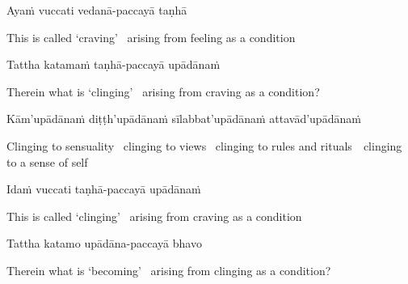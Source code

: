 Ayaṁ vuccati vedanā-paccayā taṇhā

\begin{english-hang}
  This is called `craving' \breathmark\ arising from feeling as a condition
\end{english-hang}

Tattha katamaṁ taṇhā-paccayā upādānaṁ

\begin{english-hang}
  Therein what is `clinging' \breathmark\ arising from craving as a condition?
\end{english-hang}

\begin{pali-hang}
  Kām'upādānaṁ diṭṭh'upādānaṁ sīlabbat'upādānaṁ attavād'upādānaṁ
\end{pali-hang}

\begin{english-hang}
  Clinging to sensuality \breathmark\ clinging to views \breathmark\ clinging to rules and \mbox{rituals}~\breathmark\ clinging to a sense of self\thinspace\makeatletter\hyperlink{endnote81-appendix}\makeatother
\end{english-hang}

\ifninebythirteen\clearpage\fi

Idaṁ vuccati taṇhā-paccayā upādānaṁ

\begin{english-hang}
  This is called `clinging' \breathmark\ arising from craving as a condition
\end{english-hang}

Tattha katamo upādāna-paccayā bhavo

\begin{english-hang}
  Therein what is `becoming' \breathmark\ arising from clinging as a condition?
\end{english-hang}

